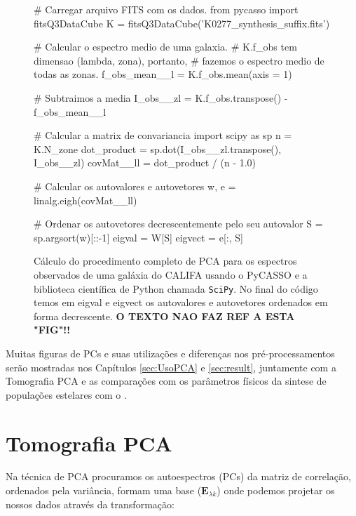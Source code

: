 \begin{figure}
\begin{python}
# Carregar arquivo FITS com os dados.
from pycasso import fitsQ3DataCube
K = fitsQ3DataCube('K0277_synthesis_suffix.fits')

# Calcular o espectro medio de uma galaxia. 
# K.f_obs tem dimensao (lambda, zona), portanto, 
# fazemos o espectro medio de todas as zonas.
f_obs_mean__l = K.f_obs.mean(axis = 1)

# Subtraimos a media
I_obs__zl = K.f_obs.transpose() - f_obs_mean__l

# Calcular a matrix de convariancia
import scipy as sp
n = K.N_zone
dot_product = sp.dot(I_obs__zl.transpose(), I_obs__zl)
covMat__ll = dot_product / (n - 1.0)   

# Calcular os autovalores e autovetores
w, e = linalg.eigh(covMat__ll)

# Ordenar os autovetores decrescentemente pelo seu autovalor
S = sp.argsort(w)[::-1]
eigval = W[S]
eigvect = e[:, S]
 
\end{python}
	\caption[Exemplo de cálculo de PCA usando o PyCASSO e SciPy] {Cálculo do
	procedimento completo de PCA para os espectros observados de uma galáxia do
	CALIFA usando o PyCASSO e a biblioteca científica de Python chamada
	\texttt{SciPy}. No final do código temos em eigval e eigvect os
	autovalores e autovetores ordenados em forma decrescente.
	{\bf\ojo O TEXTO NAO FAZ REF A ESTA "FIG"!!}
	}
	\label{fig:PCA:covMatrix}
\end{figure}

Muitas figuras de PCs e suas utilizações e diferenças nos pré-processamentos
serão mostradas nos Capítulos \ref{sec:UsoPCA} e \ref{sec:result}, juntamente
com a Tomografia PCA e as comparações com os parâmetros físicos da sintese de
populações estelares com o \starlight.


\section{Tomografia PCA}
\label{sec:PCAeTomoPCA:TomoPCA}

Na técnica de PCA procuramos os autoespectros (PCs) da matriz de correlação,
ordenados pela variância, formam uma base ($\mathbf{E}{}_{\lambda k}$) onde 
podemos projetar os nossos dados através da transformação:

